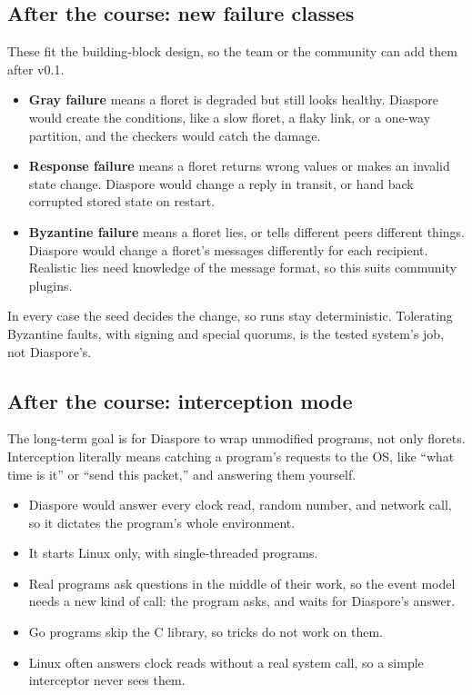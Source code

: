\documentclass[11pt,letterpaper]{article}
\newcommand{\code}[1]{\texttt{\detokenize{#1}}}
\begin{document}
\subsection{After the course: new failure classes}

These fit the building-block design, so the team or the community can add them after v0.1.

\begin{itemize}
  \item \textbf{Gray failure} means a floret is degraded but still looks healthy. Diaspore would create the conditions, like a slow floret, a flaky link, or a one-way partition, and the checkers would catch the damage.
  \item \textbf{Response failure} means a floret returns wrong values or makes an invalid state change. Diaspore would change a reply in transit, or hand back corrupted stored state on restart.
  \item \textbf{Byzantine failure} means a floret lies, or tells different peers different things. Diaspore would change a floret's messages differently for each recipient. Realistic lies need knowledge of the message format, so this suits community plugins.
\end{itemize}

In every case the seed decides the change, so runs stay deterministic. Tolerating Byzantine faults, with signing and special quorums, is the tested system's job, not Diaspore's.

\subsection{After the course: interception mode}

The long-term goal is for Diaspore to wrap unmodified programs, not only florets. Interception literally means catching a program's requests to the OS, like ``what time is it'' or ``send this packet,'' and answering them yourself.

\begin{itemize}
  \item Diaspore would answer every clock read, random number, and network call, so it dictates the program's whole environment.
  \item It starts Linux only, with single-threaded programs.
  \item Real programs ask questions in the middle of their work, so the event model needs a new kind of call: the program asks, and waits for Diaspore's answer.
  \item Go programs skip the C library, so \code{LD_PRELOAD} tricks do not work on them.
  \item Linux often answers clock reads without a real system call, so a simple interceptor never sees them.
\end{itemize}
\end{document}

